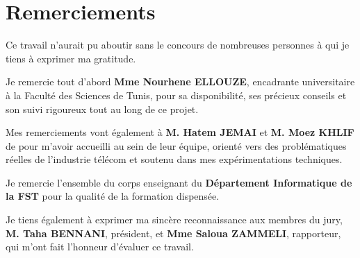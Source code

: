 \chapter*{Remerciements}

Ce travail n'aurait pu aboutir sans le concours de nombreuses personnes à qui je tiens à exprimer ma gratitude.

Je remercie tout d'abord \textbf{Mme Nourhene ELLOUZE}, encadrante universitaire à la Faculté des Sciences de Tunis, pour sa disponibilité, ses précieux conseils et son suivi rigoureux tout au long de ce projet.

Mes remerciements vont également à \textbf{M. Hatem JEMAI} et \textbf{M. Moez KHLIF} de \TT{} pour m'avoir accueilli au sein de leur équipe, orienté vers des problématiques réelles de l'industrie télécom et soutenu dans mes expérimentations techniques.

Je remercie l'ensemble du corps enseignant du \textbf{Département Informatique de la FST} pour la qualité de la formation dispensée.

Je tiens également à exprimer ma sincère reconnaissance aux membres du jury, \textbf{M. Taha BENNANI}, président, et \textbf{Mme Saloua ZAMMELI}, rapporteur, qui m'ont fait l'honneur d'évaluer ce travail. 
\clearpage
